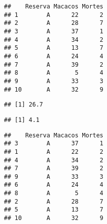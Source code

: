 \documentclass[]{article}
\newenvironment{Shaded}{\begin{snugshade}}{\end{snugshade}}
\newcommand{\CommentTok}[1]{\textcolor[rgb]{0.56,0.35,0.01}{\textit{#1}}}
\newcommand{\KeywordTok}[1]{\textcolor[rgb]{0.13,0.29,0.53}{\textbf{#1}}}
\newcommand{\NormalTok}[1]{#1}
\newcommand{\OperatorTok}[1]{\textcolor[rgb]{0.81,0.36,0.00}{\textbf{#1}}}
\newcommand{\StringTok}[1]{\textcolor[rgb]{0.31,0.60,0.02}{#1}}
\begin{document}
\begin{verbatim}
##    Reserva Macacos Mortes
## 1        A      22      2
## 2        A      28      7
## 3        A      37      1
## 4        A      34      2
## 5        A      13      7
## 6        A      24      4
## 7        A      39      2
## 8        A       5      4
## 9        A      33      3
## 10       A      32      9
\end{verbatim}

\begin{Shaded}
\end{Shaded}

\begin{verbatim}
## [1] 26.7
\end{verbatim}

\begin{Shaded}
\end{Shaded}

\begin{verbatim}
## [1] 4.1
\end{verbatim}

\begin{Shaded}
\end{Shaded}

\begin{verbatim}
##    Reserva Macacos Mortes
## 3        A      37      1
## 1        A      22      2
## 4        A      34      2
## 7        A      39      2
## 9        A      33      3
## 6        A      24      4
## 8        A       5      4
## 2        A      28      7
## 5        A      13      7
## 10       A      32      9
\end{verbatim}

\begin{Shaded}
\end{Shaded}
\end{document}

